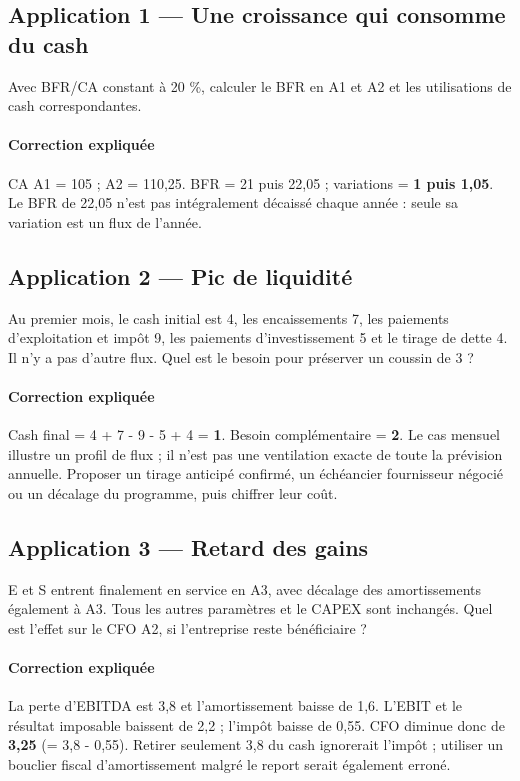 \documentclass[12pt,a4paper]{article}
\begin{document}
\subsection*{Application 1 --- Une croissance qui consomme du cash}
Avec BFR/CA constant à 20 \%, calculer le BFR en A1 et A2 et les utilisations de cash correspondantes.


\paragraph{Correction expliquée}
CA A1 = 105 ; A2 = 110,25. BFR = 21 puis 22,05 ; variations = \textbf{1 puis 1,05}. Le BFR de 22,05 n’est pas intégralement décaissé chaque année : seule sa variation est un flux de l’année.



\subsection*{Application 2 --- Pic de liquidité}
Au premier mois, le cash initial est 4, les encaissements 7, les paiements d’exploitation et impôt 9, les paiements d’investissement 5 et le tirage de dette 4. Il n’y a pas d’autre flux. Quel est le besoin pour préserver un coussin de 3 ?


\paragraph{Correction expliquée}
Cash final = 4 + 7 - 9 - 5 + 4 = \textbf{1}. Besoin complémentaire = \textbf{2}. Le cas mensuel illustre un profil de flux ; il n’est pas une ventilation exacte de toute la prévision annuelle. Proposer un tirage anticipé confirmé, un échéancier fournisseur négocié ou un décalage du programme, puis chiffrer leur coût.



\subsection*{Application 3 --- Retard des gains}
E et S entrent finalement en service en A3, avec décalage des amortissements également à A3. Tous les autres paramètres et le CAPEX sont inchangés. Quel est l’effet sur le CFO A2, si l’entreprise reste bénéficiaire ?


\paragraph{Correction expliquée}
La perte d’EBITDA est 3,8 et l’amortissement baisse de 1,6. L’EBIT et le résultat imposable baissent de 2,2 ; l’impôt baisse de 0,55. CFO diminue donc de \textbf{3,25} (= 3,8 - 0,55). Retirer seulement 3,8 du cash ignorerait l’impôt ; utiliser un bouclier fiscal d’amortissement malgré le report serait également erroné.
\end{document}
